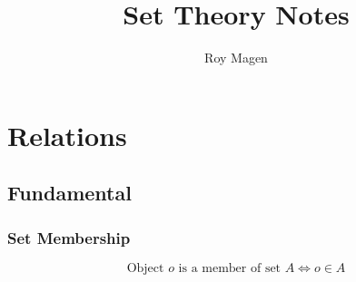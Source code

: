 \documentclass{article}
\title{Set Theory Notes}
\author{Roy Magen}
\date{ }
\begin{document}
	\section{Relations}
		\subsection{Fundamental}
			\subsubsection{Set Membership}
				\[ \text{Object } o \text{ is a member of set } A \iff o \in A \]
\end{document}
